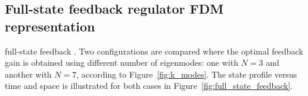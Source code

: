 \DIFaddend \subsection{Full-state feedback regulator FDM representation}


\DIFdelbegin {}\DIFdelend \DIFaddbegin {}\DIFaddend full-state feedback \DIFdelbegin {}\DIFdelend \DIFaddbegin {}\DIFaddend . Two configurations are compared where the optimal feedback gain is obtained using different number of eigenmodes: one with $N=3$ and another with $N=7$, according to Figure~\ref{fig:k_modes}. The state profile versus time and space is illustrated for both cases in Figure~\ref{fig:full_state_feedback}. 

